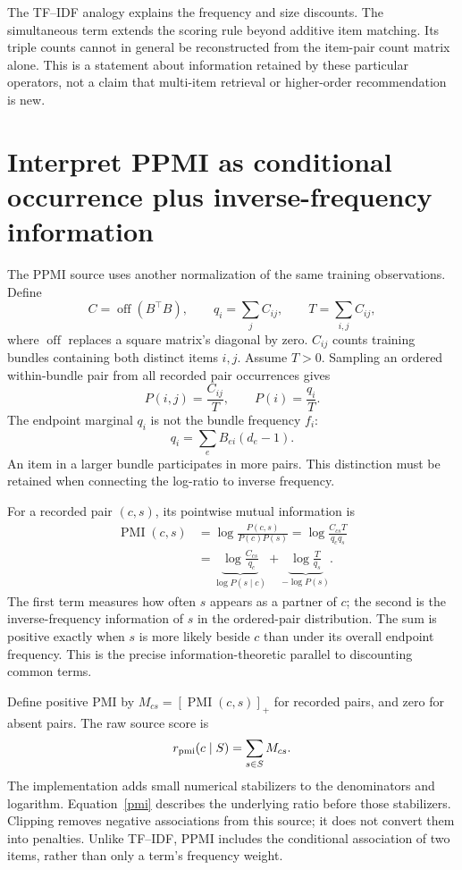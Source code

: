 \documentclass[11pt,a4paper]{article}
\newcommand{\off}{\operatorname{off}}
\begin{document}
The TF--IDF analogy explains the frequency and size discounts. The simultaneous
term extends the scoring rule beyond additive item matching. Its triple counts
cannot in general be reconstructed from the item-pair count matrix alone.
This is a statement about information retained by these particular operators,
not a claim that multi-item retrieval or higher-order recommendation is new.

\section{Interpret PPMI as conditional occurrence plus inverse-frequency information}
The PPMI source uses another normalization of the same training observations.
Define
\begin{equation}
 C=\off(B^\top B),\qquad
 q_i=\sum_jC_{ij},\qquad T=\sum_{i,j}C_{ij},
\end{equation}
where $\off$ replaces a square matrix's diagonal by zero. $C_{ij}$ counts
training bundles containing both distinct items $i,j$. Assume $T>0$.
Sampling an ordered within-bundle pair from all recorded pair occurrences gives
\[
 P(i,j)=\frac{C_{ij}}{T},\qquad
 P(i)=\frac{q_i}{T}.
\]
The endpoint marginal $q_i$ is not the bundle frequency $f_i$:
\begin{equation}
 q_i=\sum_eB_{ei}(d_e-1).
\end{equation}
An item in a larger bundle participates in more pairs. This distinction must be
retained when connecting the log-ratio to inverse frequency.

For a recorded pair $(c,s)$, its pointwise mutual information is
\begin{align}
 \operatorname{PMI}(c,s)
 &=\log\frac{P(c,s)}{P(c)P(s)}
   =\log\frac{C_{cs}T}{q_cq_s}\\
 &=\underbrace{\log\frac{C_{cs}}{q_c}}_{\log P(s\mid c)}
  +\underbrace{\log\frac{T}{q_s}}_{-\log P(s)}.\label{pmi}
\end{align}
The first term measures how often $s$ appears as a partner of $c$; the second
is the inverse-frequency information of $s$ in the ordered-pair distribution.
The sum is positive exactly when $s$ is more likely beside $c$ than under its
overall endpoint frequency. This is the precise information-theoretic parallel
to discounting common terms.

Define positive PMI by $M_{cs}=[\operatorname{PMI}(c,s)]_+$ for recorded pairs,
and zero for absent pairs. The raw source score is
\begin{equation}
 r_{\rm pmi}(c\mid S)=\sum_{s\in S}M_{cs}.
\end{equation}
The implementation adds small numerical stabilizers to the denominators and
logarithm. Equation~\eqref{pmi} describes the underlying ratio before those
stabilizers. Clipping removes negative associations from this source; it does
not convert them into penalties. Unlike TF--IDF, PPMI includes the conditional
association of two items, rather than only a term's frequency weight.
\end{document}
